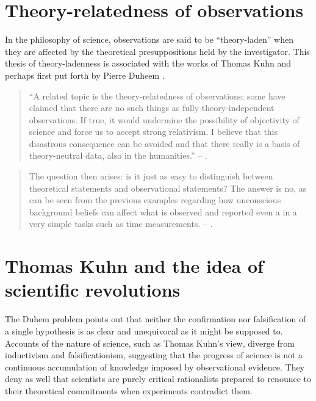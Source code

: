 \documentclass[
  12pt,
]{book}
\begin{document}
\section{Theory-relatedness of observations}\label{theory-relatedness-of-observations}

In the philosophy of science, observations are said to be ``theory-laden'' when they are affected by the theoretical presuppositions held by the investigator. This thesis of theory-ladenness is associated with the works of Thomas Kuhn and perhaps first put forth by Pierre Duheem \citep{sep-science-theory-observation}.

\begin{quote}
``A related topic is the theory-relatedness of observations; some have claimed that there are no such things as fully theory-independent observations. If true, it would undermine the possibility of objectivity of science and force us to accept strong relativism. I believe that this disastrous consequence can be avoided and that there really is a basis of theory-neutral data, also in the humanities.'' -- \citep{johansson2016philosophy}.
\end{quote}

\begin{quote}
The question then arises: is it just as easy to distinguish between theoretical statements and observational statements? The answer is no, as can be seen from the previous examples regarding how unconscious background beliefs can affect what is observed and reported even a in a very simple tasks such as time measurements. -- \citep{johansson2016philosophy}.
\end{quote}

\section{Thomas Kuhn and the idea of scientific revolutions}\label{thomas-kuhn-and-the-idea-of-scientific-revolutions}

The Duhem problem points out that neither the confirmation nor falsification of a single hypothesis is as clear and unequivocal as it might be supposed to.
Accounts of the nature of science, such as Thomas Kuhn's view, diverge from inductivism and falsificationism, suggesting that the progress of science is not a continuous accumulation of knowledge imposed by observational evidence. They deny as well that scientists are purely critical rationalists prepared to renounce to their theoretical commitments when experiments contradict them.
\end{document}
